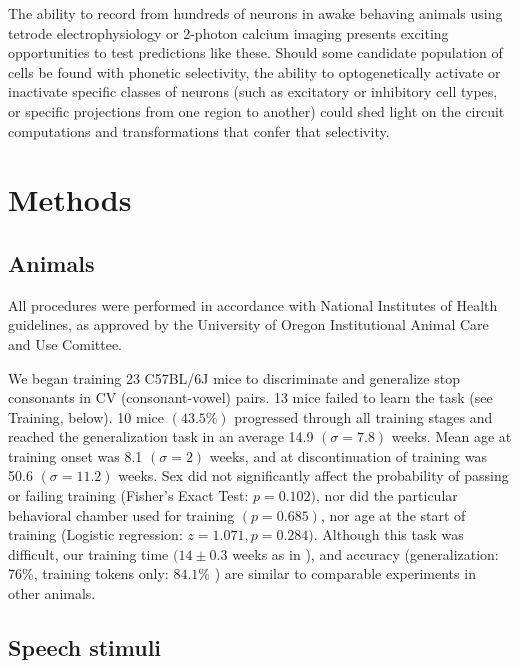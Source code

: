 \documentclass[11pt]{article}\usepackage[]{graphicx}\usepackage[]{color}
\begin{document}
The ability to record from hundreds of neurons in awake behaving animals using tetrode electrophysiology or 2-photon calcium imaging presents exciting opportunities to test predictions like these. Should some candidate population of cells be found with phonetic selectivity, the ability to optogenetically activate or inactivate specific classes of neurons (such as excitatory or inhibitory cell types, or specific projections from one region to another) could shed light on the circuit computations and transformations that confer that selectivity.

%
%
%
%
\section{\Large Methods}

\subsection{Animals}

All procedures were performed in accordance with National Institutes of Health guidelines, as approved by the University of Oregon Institutional Animal Care and Use Comittee.

We began training 23 C57BL/6J mice to discriminate and generalize stop consonants in CV (consonant-vowel) pairs. 13 mice failed to learn the task (see Training, below). 10 mice $ (43.5\%) $ progressed through all training stages and reached the generalization task in an average 14.9 $(\sigma = 7.8)$ weeks. Mean age at training onset was 8.1 $(\sigma = 2)$ weeks, and at discontinuation of training was 50.6 $(\sigma = 11.2)$ weeks. Sex did not significantly affect the probability of passing or failing training (Fisher's Exact Test: $p = 0.102)$, nor did the particular behavioral chamber used for training $ (p = 0.685) $, nor age at the start of training (Logistic regression: $z = 1.071, p=0.284)$. Although this task was difficult, our training time $(14\pm 0.3$ weeks as in \cite{Engineer2015}), and accuracy (generalization: 76\%\cite{Kluender1987}, training tokens only: $84.1\%$ \cite{Engineer2015}) are similar to comparable experiments in other animals.

\subsection{Speech stimuli}
\end{document}
